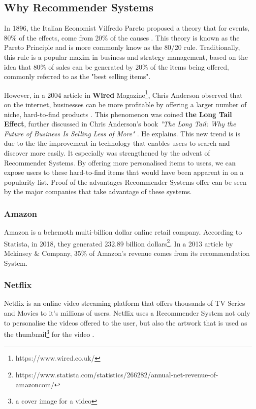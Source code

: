 \subsection{Why Recommender Systems} \label{subsec:WhyRecSystems}
In 1896, the Italian Economist Vilfredo Pareto proposed a theory that for events, 80\% of the effects, come from 20\% of the causes \cite{sanders1987pareto}. This theory is known as the Pareto Principle and is more commonly know as the 80/20 rule. Traditionally, this rule is a popular maxim in business and strategy management, based on the idea that 80\% of sales can be generated by 20\% of the items being offered, commonly referred to as the "best selling items".

However, in a 2004 article in \textbf{Wired} Magazine\footnote{https://www.wired.co.uk/}, Chris Anderson observed that on the internet, businesses can be more profitable by offering a larger number of niche, hard-to-find products \cite{brynjolfsson2011goodbye}. This phenomenon was coined \textbf{the Long Tail Effect}, further discussed in Chris Anderson's book \textit{"The Long Tail: Why the Future of Business Is Selling Less of More"} \cite{anderson2006long}. He explains. This new trend is is due to the the improvement in technology that enables users to search and discover more easily. It especially was strengthened by the advent of Recommender Systems. By offering more personalised items to users, we can expose users to these hard-to-find items that would have been apparent in on a popularity list. Proof of the advantages Recommender Systems offer can be seen by the major companies that take advantage of these systems.


\subsubsection{Amazon} 
Amazon is a behemoth multi-billion dollar online retail company. According to Statista, in 2018, they generated 232.89 billion dollars\footnote{https://www.statista.com/statistics/266282/annual-net-revenue-of-amazoncom/}. In a 2013 article by Mckinsey \& Company, 35\% of Amazon's revenue comes from its recommendation System. 

\subsubsection{Netflix}
Netflix is an online video streaming platform that offers thousands of TV Series and Movies to it's millions of users. Netflix uses a Recommender System not only to personalise the videos offered to the user, but also the artwork that is used as the thumbnail\footnote{a cover image for a video} for the video \cite{josefina2018netflix}.

